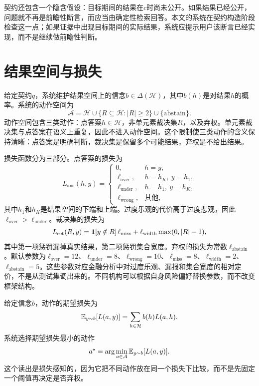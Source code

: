 契约还包含一个隐含假设：目标期间的结果在$c$时尚未公开。如果结果已经公开，问题就不再是前瞻性断言，而应当由确定性检索回答。本文的系统在契约构造阶段检查这一点；如果证据中出现目标期间的实际结果，系统应提示用户该断言已经实现，而不是继续做前瞻性判断。

\section{结果空间与损失}

给定契约$q$，系统维护结果空间上的信念$b\in\Delta(\mathcal H)$，其中$b(h)$是对结果$h$的概率。系统的动作空间为
\begin{equation}
\mathcal A=\mathcal H\cup\{R\subseteq\mathcal H:|R|\ge2\}\cup\{\text{abstain}\}.
\label{eq:action}
\end{equation}
动作空间包含三类动作：点答案$h\in\mathcal H$，非单元素裁决集$R$，以及弃权。单元素裁决集与点答案在语义上重复，因此不进入动作空间。这个限制使三类动作的含义保持清晰：点答案是明确判断，裁决集是保留多个可能结果，弃权是不给出结果。

损失函数分为三部分。点答案的损失为
\begin{equation}
L_{\text{ans}}(h,y)=
\begin{cases}
0, & h=y,\\
\ell_{\text{over}}, & h=h_K,\ y=h_1,\\
\ell_{\text{under}}, & h=h_1,\ y=h_K,\\
\ell_{\text{wrong}}, & \text{其他},
\end{cases}
\label{eq:ansloss}
\end{equation}
其中$h_1$和$h_K$是结果空间的下端和上端。过度乐观的代价高于过度悲观，因此$\ell_{\text{over}}>\ell_{\text{under}}$。裁决集的损失为
\begin{equation}
L_{\text{set}}(R,y)=\mathbf{1}[y\notin R]\,\ell_{\text{miss}}
+\ell_{\text{width}}\max(0,|R|-1),
\label{eq:setloss}
\end{equation}
其中第一项惩罚漏掉真实结果，第二项惩罚集合宽度。弃权的损失为常数$\ell_{\text{abstain}}$。默认参数为$\ell_{\text{over}}=12$、$\ell_{\text{under}}=8$、$\ell_{\text{wrong}}=10$、$\ell_{\text{miss}}=8$、$\ell_{\text{width}}=2$、$\ell_{\text{abstain}}=5$。这些参数对应金融分析中对过度乐观、漏报和集合宽度的相对定价，不是从测试集调出来的。不同机构可以根据自身风险偏好替换参数，而不改变框架结构。

给定信念$b$，动作的期望损失为
\begin{equation}
\mathbb{E}_{y\sim b}[L(a,y)]=\sum_{h\in\mathcal H}b(h)L(a,h).
\label{eq:expectedloss}
\end{equation}
系统选择期望损失最小的动作
\begin{equation}
a^\star=\arg\min_{a\in\mathcal A}\mathbb{E}_{y\sim b}[L(a,y)].
\label{eq:argmin}
\end{equation}
这个读出是损失感知的，因为它把不同动作放在同一个损失下比较，而不是先固定一个阈值再决定是否弃权。

